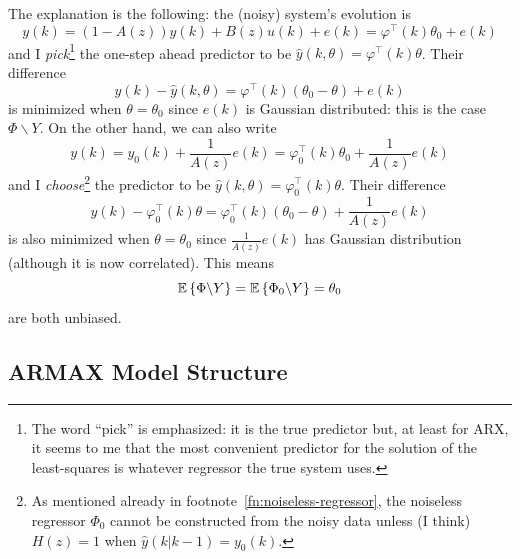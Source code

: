 The explanation is the following: the (noisy) system's evolution is
\begin{equation*}
  y(k) = (1-A(z))y(k) + B(z)u(k) + e(k) = \varphi^\top(k)\theta_0 + e(k)
\end{equation*}
and I \emph{pick}\footnote{The word ``pick'' is emphasized: it is the true predictor but, at least for ARX, it seems to me that the most convenient predictor for the solution of the least-squares is whatever regressor the true system uses.} the one-step ahead predictor to be $\hat{y}(k,\theta) = \varphi^\top(k)\theta$. Their difference
\begin{equation*}
  y(k)-\hat{y}(k,\theta) = \varphi^\top(k)(\theta_0-\theta) + e(k)
\end{equation*}
is minimized when $\theta=\theta_0$ since $e(k)$ is Gaussian distributed: this is the case $\Phi\backslash Y$. On the other hand, we can also write
\begin{equation*}
  y(k) = y_0(k) + \frac{1}{A(z)}e(k) = \varphi_0^\top(k)\theta_0 + \frac{1}{A(z)}e(k)
\end{equation*}
and I \emph{choose}\footnote{ As mentioned already in footnote~\ref{fn:noiseless-regressor}, the noiseless regressor $\Phi_0$ cannot be constructed from the noisy data unless (I think) $H(z)=1$ when $\hat{y}(k|k-1)=y_0(k)$.} the predictor to be $\hat{y}(k,\theta) = \varphi_0^\top(k)\theta$. Their difference
\begin{equation*}
  y(k) - \varphi_0^\top(k)\theta = \varphi_0^\top(k)(\theta_0-\theta) + \frac{1}{A(z)}e(k)
\end{equation*}
is also minimized when $\theta=\theta_0$ since $\frac{1}{A(z)}e(k)$ has Gaussian distribution (although it is now correlated). This means
\begin{equation*}
  \mathbb{E}\left\{\Phi\backslash Y\right\} = \mathbb{E}\left\{\Phi_0\backslash Y\right\} = \theta_0
\end{equation*}
are both unbiased.

\subsection{ARMAX Model Structure}
\label{sec:ARMAX}

